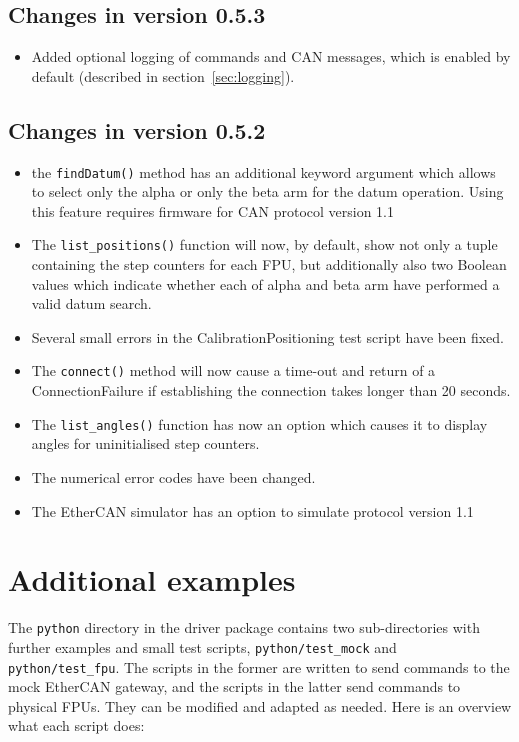 \documentclass[11pt,a4paper]{report}
\begin{document}
\subsection*{Changes in version 0.5.3}
\begin{itemize}
\item Added optional logging of commands and CAN messages, which
  is enabled by default (described in section~\ref{sec:logging}).
\end{itemize}

\subsection*{Changes in version 0.5.2}
\begin{itemize}
\item the \texttt{findDatum()} method has an additional keyword
  argument which allows to select only the alpha or only the beta arm
  for the datum operation. Using this feature requires firmware for
  CAN protocol version 1.1
\item The \texttt{list\_positions()} function will now, by default,
  show not only a tuple containing the step counters for each FPU, but
  additionally also two Boolean values which indicate whether each of
  alpha and beta arm have performed a valid datum search.
\item Several small errors in the CalibrationPositioning test script
  have been fixed.
\item The \texttt{connect()} method will now cause a time-out and
  return of a ConnectionFailure if establishing the connection takes
  longer than 20 seconds.
\item The \texttt{list\_angles()} function has now an option which
  causes it to display angles for uninitialised step counters.
\item The numerical error codes have been changed.
\item The EtherCAN simulator has an option to simulate protocol version 1.1
\end{itemize}

\appendix

\section{Additional examples}
\label{sec:moreexamples}

The \texttt{python} directory in the driver package contains
two sub-directories with further examples and small test scripts,
\texttt{python/test\_mock} and \texttt{python/test\_fpu}. The scripts in
the former are written to send commands to the mock EtherCAN
gateway, and the scripts in the latter send commands
to physical FPUs. They can be modified and adapted
as needed. Here is an overview what each script does:
\end{document}
